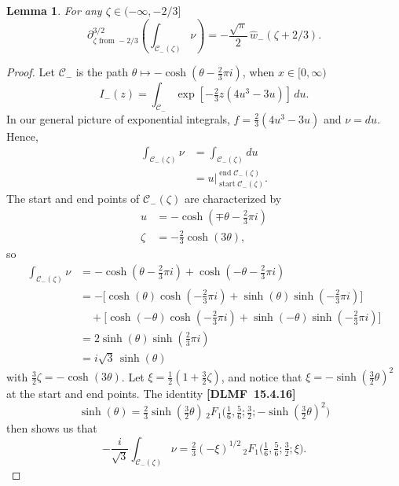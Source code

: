 \documentclass{article}
\newtheorem{lemma}[definition]{Lemma}
\begin{document}
\begin{lemma}\label{claim 3}
For any $\zeta\in (-\infty,-2/3]$
\[ \partial^{3/2}_{\zeta \text{ from } -2/3} \left( \int_{\mathcal{C}_-(\zeta)} \nu \right) = - \frac{\sqrt{\pi}}{2}\,\hat{w}_-(\zeta+2/3). \]
\end{lemma}
\begin{proof}
Let $\mathcal{C}_-$ is the path $\theta \mapsto -\cosh(\theta - \tfrac{2}{3}\pi i)$, when $x \in [0, \infty)$ 
\[ I_-(z) = \int_{\mathcal{C}_-} \exp\left[-\tfrac{2}{3} z \left(4u^3 - 3u\right)\right]\,du. \]
In our general picture of exponential integrals, $f = \tfrac{2}{3}(4u^3 - 3u)$ and $\nu = du$. Hence,
\begin{align*}
\int_{\mathcal{C}_-(\zeta)} \nu & = \int_{\mathcal{C}_-(\zeta)} du \\
& = u \Big|_{\operatorname{start} \mathcal{C}_-(\zeta)}^{\operatorname{end} \mathcal{C}_-(\zeta)}.
\end{align*}
The start and end points of $\mathcal{C}_-(\zeta)$ are characterized by
\begin{align*}
u & = -\cosh(\mp\theta - \tfrac{2}{3}\pi i) \\
\zeta & = -\tfrac{2}{3} \cosh(3\theta),
\end{align*}
so
\begin{align*}
\int_{\mathcal{C}_-(\zeta)} \nu & =- \cosh(\theta - \tfrac{2}{3}\pi i) + \cosh(-\theta - \tfrac{2}{3}\pi i) \\
& =- \big[\cosh(\theta) \cosh(-\tfrac{2}{3}\pi i) + \sinh(\theta) \sinh(-\tfrac{2}{3}\pi i)\big] \\
& \quad + \big[\cosh(-\theta) \cosh(-\tfrac{2}{3}\pi i) + \sinh(-\theta) \sinh(-\tfrac{2}{3}\pi i)\big] \\
& = 2\sinh(\theta) \sinh(\tfrac{2}{3}\pi i) \\
& = i\sqrt{3}\,\sinh(\theta)
\end{align*}
with $\tfrac{3}{2} \zeta = -\cosh(3\theta)$. Let $\xi = \tfrac{1}{2}(1 + \tfrac{3}{2}\zeta)$, and notice that $\xi =- \sinh(\tfrac{3}{2} \theta)^2$ at the start and end points. The identity \textbf{[DLMF~15.4.16]}
\[ \sinh(\theta) = \tfrac{2}{3} \sinh(\tfrac{3}{2} \theta)\, {}_2F_1\big(\tfrac{1}{6}, \tfrac{5}{6}; \tfrac{3}{2}; -\sinh(\tfrac{3}{2} \theta)^2\big) \]
then shows us that
\[ -\frac{i}{\sqrt{3}} \int_{\mathcal{C}_-(\zeta)} \nu = \tfrac{2}{3} (-\xi)^{1/2}\, {}_2F_1\big(\tfrac{1}{6}, \tfrac{5}{6}; \tfrac{3}{2}; \xi\big). \]


\end{proof}
\end{document}
